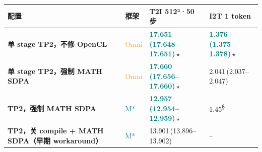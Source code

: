 \begin{tabularx}{\textwidth}{>{\bfseries}p{5.9cm} p{0.9cm} Y Y}
\toprule
{}
配置 & 框架 & T2I 512²·50 步 & I2T 1 token \\
\midrule
单 stage TP2，不修 OpenCL & \textcolor{Orange}{Omni} & \textbf{\textcolor{Teal}{17.651\,\textcolor{Muted}{(17.648--17.651)}}}\,$\star$ & \textbf{\textcolor{Teal}{1.376\,\textcolor{Muted}{(1.375--1.378)}}}\,$\star$ \\
单 stage TP2，强制 MATH SDPA & \textcolor{Orange}{Omni} & \textbf{\textcolor{Teal}{17.660\,\textcolor{Muted}{(17.656--17.660)}}}\,$\star$ & 2.041\,\textcolor{Muted}{(2.037--2.047)} \\
TP2，强制 MATH SDPA & \textcolor{Teal}{M*} & \textbf{\textcolor{Teal}{12.957\,\textcolor{Muted}{(12.954--12.959)}}}\,$\star$ & \textcolor{Muted}{1.45\textsuperscript{§}} \\
TP2，关 compile + MATH SDPA（早期 workaround） & \textcolor{Teal}{M*} & 13.901\,\textcolor{Muted}{(13.896--13.902)} & -- \\
\bottomrule
\end{tabularx}

